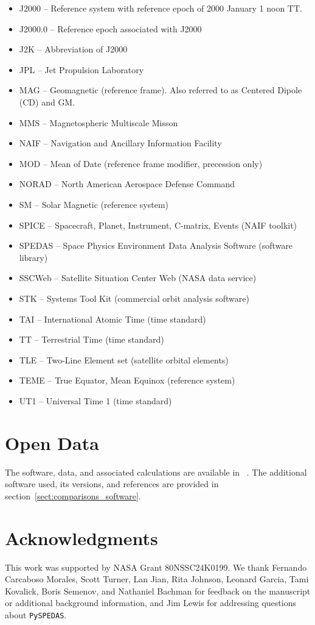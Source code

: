 \documentclass[draft]{agujournal2019}
\begin{document}
\begin{itemize}
\item J2000 -- Reference system with reference epoch of 2000 January 1 noon TT.
\item J2000.0 -- Reference epoch associated with J2000
\item J2K -- Abbreviation of J2000
\item JPL -- Jet Propulsion Laboratory
\item MAG -- Geomagnetic (reference frame). Also referred to as Centered Dipole (CD) and GM.
\item MMS -- Magnetospheric Multiscale Misson 
\item NAIF -- Navigation and Ancillary Information Facility 
\item MOD -- Mean of Date (reference frame modifier, precession only)
\item NORAD -- North American Aerospace Defense Command
\item SM -- Solar Magnetic (reference system)
\item SPICE -- Spacecraft, Planet, Instrument, C-matrix, Events (NAIF toolkit)
\item SPEDAS -- Space Physics Environment Data Analysis Software (software library)
\item SSCWeb -- Satellite Situation Center Web (NASA data service)
\item STK -- Systems Tool Kit (commercial orbit analysis software)
\item TAI -- International Atomic Time (time standard)
\item TT -- Terrestrial Time (time standard)
\item TLE -- Two-Line Element set (satellite orbital elements)
\item TEME -- True Equator, Mean Equinox (reference system)
\item UT1 -- Universal Time 1 (time standard)
\end{itemize}

\section{Open Data}

The software, data, and associated calculations are available in ~. The additional software used, its versions, and references are provided in section~\ref {sect:comparisons_software}.

\section{Acknowledgments}

This work was supported by NASA Grant 80NSSC24K0199. We thank Fernando Carcaboso Morales, Scott Turner, Lan Jian, Rita Johnson, Leonard Garcia, Tami Kovalick, Boris Semenov, and Nathaniel Bachman for feedback on the manuscript or additional background information, and Jim Lewis for addressing questions about \texttt{PySPEDAS}. 


\end{document}
